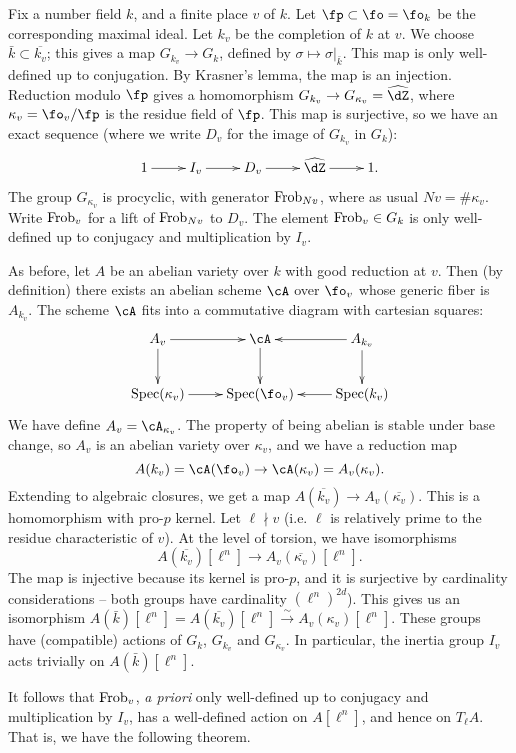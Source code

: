 Fix a number field $k$, and a finite place $v$ of $k$. Let 
$\fp\subset \fo=\fo_k$ be the corresponding maximal ideal. Let $k_v$ be the 
completion of $k$ at $v$. We choose $\bar k\subset \overline{k_v}$; this gives 
a map $G_{k_v} \to G_k$, defined by $\sigma\mapsto \sigma|_{\bar k}$. This map 
is only well-defined up to conjugation. By Krasner's lemma, the map is an 
injection. Reduction modulo $\fp$ gives a homomorphism 
$G_{k_v} \to G_{\kappa_v}=\widehat\dZ$, where $\kappa_v = \fo_v/\fp$ is the 
residue field of $\fp$. This map is surjective, so we have an exact sequence 
(where we write $D_v$ for the image of $G_{k_v}$ in $G_k$):
\[\xymatrix{
  1 \ar[r] 
    & I_v \ar[r] 
    & D_v \ar[r] 
    & \widehat\dZ \ar[r] 
    & 1 \text{.}
}\]
The group $G_{\kappa_v}$ is procyclic, with generator 
$\mathrm{Frob}_{N v}$, where as usual $N v = \# \kappa_v$. Write $\mathrm{Frob}_v$ for a lift 
of $\mathrm{Frob}_{N v}$ to $D_v$. The element $\mathrm{Frob}_v\in G_k$ is only well-defined up 
to conjugacy and multiplication by $I_v$. 

As before, let $A$ be an abelian variety over $k$ with good reduction at $v$. 
Then (by definition) there exists an abelian scheme $\cA$ over $\fo_v$ whose 
generic fiber is $A_{k_v}$. The scheme $\cA$ fits into a commutative diagram 
with cartesian squares: 
\[\xymatrix{
  A_v \ar[r] \ar[d] 
    & \cA \ar[d] 
    & A_{k_v} \ar[l] \ar[d] \\
  \spec(\kappa_v) \ar[r] 
    & \spec(\fo_v) 
    & \spec(k_v) \ar[l] 
}\]
We have define $A_v=\cA_{\kappa_v}$. The property of being abelian is stable 
under base change, so $A_v$ is an abelian variety over $\kappa_v$, and we have 
a reduction map 
\[
  A(k_v) = \cA(\fo_v) \to \cA(\kappa_v) = A_v(\kappa_v) \text{.}
\]
Extending to algebraic closures, we get a map 
$A(\overline{k_v}) \to A_v(\overline{\kappa_v})$. This is a homomorphism with 
pro-$p$ kernel. Let $\ell\nmid v$ (i.e. $\ell$ is relatively prime to the 
residue characteristic of $v$). At the level of torsion, we have isomorphisms 
\[
  A(\overline{k_v})[\ell^n] \to A_v(\overline{\kappa_v})[\ell^n] \text{.}
\]
The map is injective because its kernel is pro-$p$, and it is surjective by 
cardinality considerations -- both groups have cardinality $(\ell^n)^{2 d}$). 
This gives us an isomorphism 
$A(\bar k)[\ell^n] = A(\overline{k_v})[\ell^n]\xrightarrow\sim A_v(\kappa_v)[\ell^n]$. 
These groups have (compatible) actions of $G_k$, $G_{k_v}$ and $G_{\kappa_v}$. In 
particular, the inertia group $I_v$ acts trivially on $A(\bar k)[\ell^n]$. 

It follows that $\mathrm{Frob}_v$, \emph{a priori} only well-defined up to conjugacy 
and multiplication by $I_v$, has a well-defined action on $A[\ell^n]$, and 
hence on $T_\ell A$. That is, we have the following theorem. 

